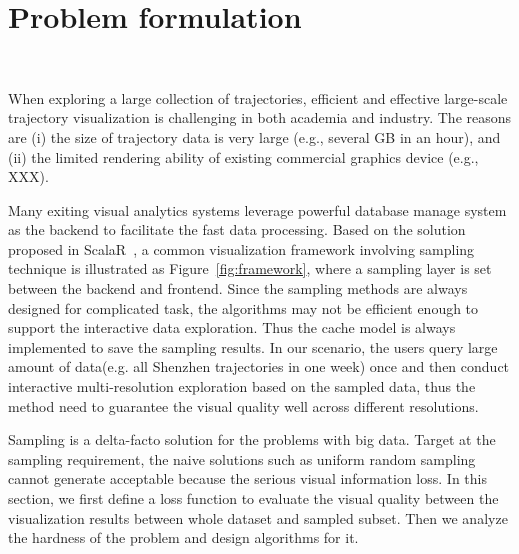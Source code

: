 \section{Problem formulation}~\label{sec:pro}

When exploring a large collection of trajectories, efficient and effective large-scale trajectory visualization is challenging in both academia and industry.
The reasons are (i) the size of trajectory data is very large (e.g., several GB in an hour),
and (ii) the limited rendering ability of existing commercial graphics device (e.g., XXX).


Many exiting visual analytics systems leverage powerful database manage system as the backend to facilitate the fast data processing. Based on the solution proposed in ScalaR~\cite{battle2013dynamic}, a common visualization framework involving sampling technique is illustrated as Figure~\ref{fig:framework}, where a sampling layer is set between the backend and frontend. Since the sampling methods are always designed for complicated task, the algorithms may not be efficient enough to support the interactive data exploration. Thus the cache model is always implemented to save the sampling results. In our scenario, the users query large amount of data(e.g. all Shenzhen trajectories in one week) once and then conduct interactive multi-resolution exploration based on the sampled data, thus the method need to guarantee the visual quality well across different resolutions.

Sampling is a delta-facto solution for the problems with big data. Target at the sampling requirement, the naive solutions such as uniform random sampling cannot generate acceptable because the serious visual information loss. In this section, we first define a loss function to evaluate the visual quality between the visualization results between whole dataset and sampled subset. Then we analyze the hardness of the problem and design algorithms for it.  



